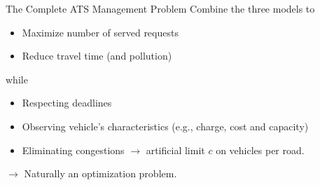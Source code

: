 \begin{frame}{The Complete ATS Management Problem}
	Combine the three models to
	\begin{itemize}
		\item Maximize number of served requests
		\item Reduce travel time (and pollution)
	\end{itemize}
	while
	\begin{itemize}
		\item Respecting deadlines
		\item Observing vehicle's characteristics (e.g., charge, cost and capacity)
		\item  Eliminating congestions $\rightarrow$ artificial limit $c$ on vehicles per road.
	\end{itemize}
		\vspace{0.5cm}
	$\rightarrow$ Naturally an optimization problem.
	
\end{frame}

